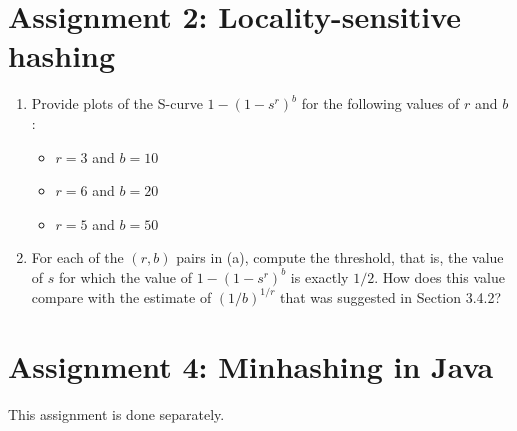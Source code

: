 \documentclass{article}
\begin{document}
\section{Assignment 2: Locality-sensitive hashing}
\begin{enumerate}
\item{Provide plots of the S-curve $1-(1-s^r)^b$ for the following values of $r$ and $b$:
	\begin{itemize}
		\item $r=3$ and $b=10$
		\item $r=6$ and $b=20$
		\item $r=5$ and $b=50$
	\end{itemize}
}

\item{For each of the $(r,b)$ pairs in (a), compute the threshold, that is, the value of $s$ for which the value of $1-(1-s^r)^b$ is exactly $1/2$. How does this value compare with the estimate of $(1/b)^{1/r}$ that was suggested in Section 3.4.2?}
\end{enumerate}

\section{Assignment 4: Minhashing in Java}
This assignment is done separately.
\end{document}
